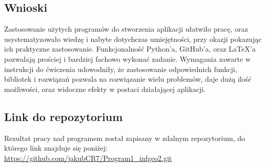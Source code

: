 \documentclass[10pt,a4paper]{article}
\begin{document}
\subsection{Wnioski}
Zastosowanie użytych programów do stworzenia aplikacji ułatwiło pracę, oraz usystematyzowało wiedzę i nabyte dotychczas umiejętności, przy okazji pokazując ich praktyczne zastosowanie. Funkcjonalność Python'a, GitHub'a, oraz LaTeX'a pozwalają prościej i bardziej fachowo wykonać zadanie. Wymagania zawarte w instrukcji do ćwiczenia udowodniły, że zastosowanie odpowiednich funkcji, bibliotek i rozwiązań pozwala na rozwiązanie wielu problemów, daje dużą ilość możliwości, oraz widoczne efekty w postaci działającej aplikacji.
\subsection{Link do repozytorium}
Rezultat pracy nad programem został zapisany w zdalnym repozytorium, do którego link znajduje się poniżej:
\newline
\href{https://github.com/jakubCR7/Program1_infgeo2.git}{https://github.com/jakubCR7/Program1_infgeo2.git}
\end{document}
